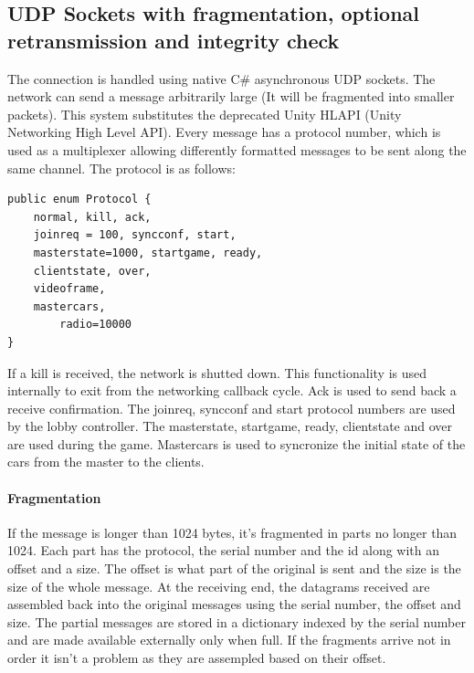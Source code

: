 \documentclass[12pt]{article}
\begin{document}
\clearpage

\subsection{UDP Sockets with fragmentation, optional retransmission and integrity check}
The connection is handled using native C\# asynchronous UDP sockets. The network can send a message arbitrarily large (It will be fragmented into smaller packets). This system substitutes the deprecated Unity HLAPI (Unity Networking High Level API). Every message has a protocol number, which is used as a multiplexer allowing differently formatted messages to be sent along the same channel. The protocol is as follows:


\lstset{style=sharpc}
\begin{lstlisting}
public enum Protocol {
	normal, kill, ack,
	joinreq = 100, syncconf, start, 
	masterstate=1000, startgame, ready, 
	clientstate, over, 
	videoframe, 
	mastercars,
        radio=10000
}
\end{lstlisting}


If a kill is received, the network is shutted down. This functionality is used internally to exit from the networking callback cycle. Ack is used to send back a receive confirmation. The joinreq, syncconf and start protocol numbers are used by the lobby controller. The masterstate, startgame, ready, clientstate and over are used during the game. Mastercars is used to syncronize the initial state of the cars from the master to the clients. \\

\clearpage

\paragraph{Fragmentation}
If the message is longer than 1024 bytes, it's fragmented in parts no longer than 1024. Each part has the protocol, the serial number and the id along with an offset and a size. The offset is what part of the original is sent and the size is the size of the whole message. At the receiving end, the datagrams received are assembled back into the original messages using the serial number, the offset and size. The partial messages are stored in a dictionary indexed by the serial number and are made available externally only when full. If the fragments arrive not in order it isn't a problem as they are assempled based on their offset.
\end{document}
